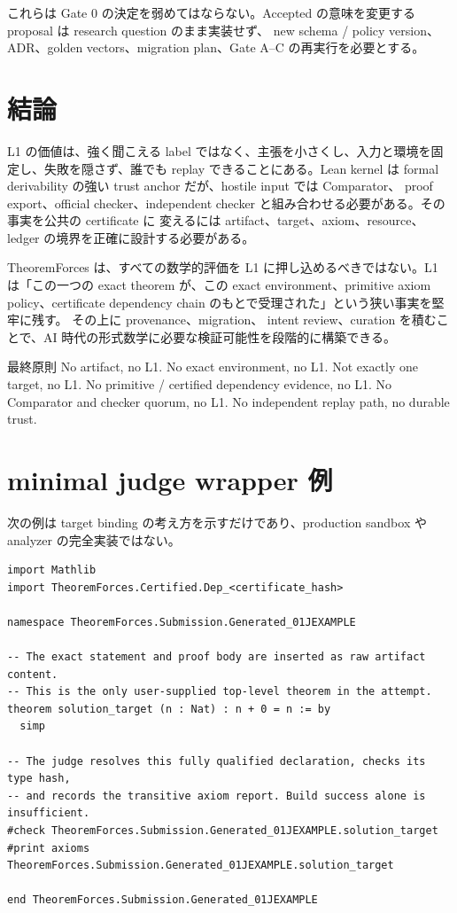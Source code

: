 \documentclass[a4paper,11pt]{ltjsarticle}
\begin{document}
これらは Gate 0 の決定を弱めてはならない。Accepted の意味を変更する proposal は research question のまま実装せず、
new schema / policy version、ADR、golden vectors、migration plan、Gate A--C の再実行を必要とする。

\section{結論}

L1 の価値は、強く聞こえる label ではなく、主張を小さくし、入力と環境を固定し、失敗を隠さず、誰でも replay
できることにある。Lean kernel は formal derivability の強い trust anchor だが、hostile input では Comparator、
proof export、official checker、independent checker と組み合わせる必要がある。その事実を公共の certificate に
変えるには artifact、target、axiom、resource、ledger の境界を正確に設計する必要がある。

TheoremForces は、すべての数学的評価を L1 に押し込めるべきではない。L1 は「この一つの exact theorem が、この exact
environment、primitive axiom policy、certificate dependency chain のもとで受理された」という狭い事実を堅牢に残す。
その上に provenance、migration、
intent review、curation を積むことで、AI 時代の形式数学に必要な検証可能性を段階的に構築できる。

\begin{principlebox}{最終原則}
No artifact, no L1. No exact environment, no L1. Not exactly one target, no L1.
No primitive / certified dependency evidence, no L1. No Comparator and checker quorum, no L1.
No independent replay path, no durable trust.
\end{principlebox}

\appendix
\section{minimal judge wrapper 例}

次の例は target binding の考え方を示すだけであり、production sandbox や analyzer の完全実装ではない。

\begin{lstlisting}
import Mathlib
import TheoremForces.Certified.Dep_<certificate_hash>

namespace TheoremForces.Submission.Generated_01JEXAMPLE

-- The exact statement and proof body are inserted as raw artifact content.
-- This is the only user-supplied top-level theorem in the attempt.
theorem solution_target (n : Nat) : n + 0 = n := by
  simp

-- The judge resolves this fully qualified declaration, checks its type hash,
-- and records the transitive axiom report. Build success alone is insufficient.
#check TheoremForces.Submission.Generated_01JEXAMPLE.solution_target
#print axioms TheoremForces.Submission.Generated_01JEXAMPLE.solution_target

end TheoremForces.Submission.Generated_01JEXAMPLE
\end{lstlisting}
\end{document}
